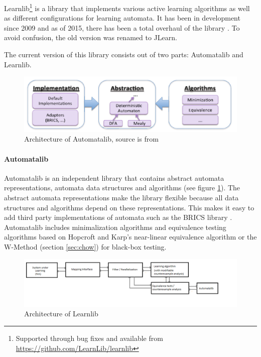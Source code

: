 \documentclass[multi,crop=false,class=article]{standalone}
\begin{document}
Learnlib\footnote{Supported through bug fixes and available from
\url{https://github.com/LearnLib/learnlib}} is a library that implements various
active learning algorithms as well as different configurations for learning
automata. It has been in development since 2009 \cite{Raffelt2009} and as of
2015, there has been a total overhaul of the library \cite{Isberner2015b}. To
avoid confusion, the old version was renamed to JLearn.

The current version of this library consists out of two parts: Automatalib and
Learnlib.

\begin{figure}[!ht]
	\includegraphics[width=\textwidth]{Tool_images/automatalib_architecture.png}
	\caption{Architecture of Automatalib, source is from \cite{Isberner2015b}}
	\label{fig:automatalib_arch}
\end{figure}

\paragraph{Automatalib} Automatalib is an independent library that contains
abstract automata representations, automata data structures and algorithms (see
figure \ref{fig:automatalib_arch}). The
abstract automata representations make the library flexible because all data
structures and algorithms depend on these representations. This makes it easy
to add third party implementations of automata such as the BRICS library
\cite{Alur2005}. Automatalib includes minimalization algorithms and equivalence
testing algorithms based on Hopcroft and Karp's near-linear equivalence
algorithm \cite{Hopcroft1971} or the W-Method (section \ref{sec:chow}) for
black-box testing.

\begin{figure}[!ht]
	\includegraphics[width=\textwidth]{Tool_images/learnlib_architecture.png}
	\caption{Architecture of Learnlib}
	\label{fig:learnlib_arch}
\end{figure}
\end{document}
